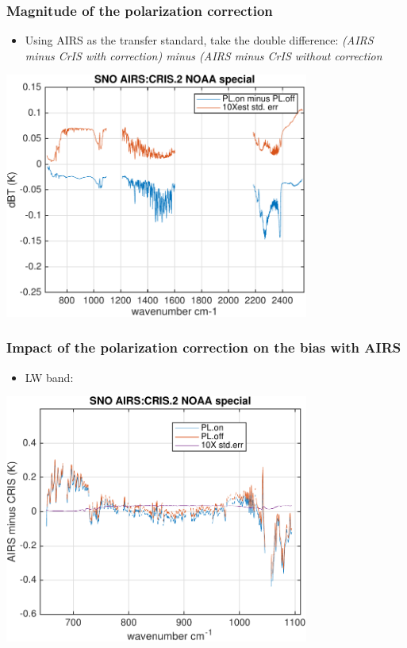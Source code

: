 \documentclass[10pt,t]{beamer} \usepackage[utf8]{inputenc}
\newcommand{\cris}{\textsf{CrIS}\xspace}
\newcommand{\airs}{\textsf{AIRS}\xspace}
\begin{document}
\begin{frame}
  \frametitle{Magnitude of the polarization correction}
  \vspace{-0.125in} %
  \begin{itemize}
     \item Using AIRS as the transfer standard, take the double difference:
     \textit{ (\airs minus \cris with correction) minus (\airs minus \cris
      without correction}
  \end{itemize}
  
  \begin{center}
    \noindent\includegraphics[width=0.75\textwidth]{Figs/sno_airs_cris2_bias_dble_diff_spectrum_polz.pdf}
  \end{center}
   
\end{frame}
\begin{frame}
  \frametitle{Impact of the polarization correction on the bias with AIRS}
  \vspace{-0.125in} %
  \begin{itemize}
     \item LW band: 
  \end{itemize}
  
  \begin{center}
    \noindent\includegraphics[width=0.75\textwidth]{Figs/sno_airs_cris2_bias_spectrum_polz_lw.pdf}
  \end{center}
   
\end{frame}
\end{document}
